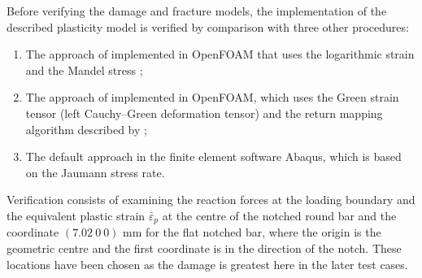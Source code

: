 \documentclass[sn-mathphys,Numbered]{sn-jnl}%
\begin{document}
Before verifying the damage and fracture models, the implementation of the described plasticity model is verified by comparison with three other procedures:
\begin{enumerate}[label=(\alph*)]
	\item The approach of \citet{clancy_improving_2019} implemented in OpenFOAM that uses the logarithmic strain and the Mandel stress \cite{caminero_modeling_2011};
	\item The approach of \citet{cardiff_lagrangian_2017} implemented in OpenFOAM, which uses the Green strain tensor (left Cauchy–Green deformation tensor) and the return mapping algorithm described by \citet{simo_computational_1998};
	\item The default approach in the finite element software Abaqus, which is based on the Jaumann stress rate.
\end{enumerate}

Verification consists of examining the reaction forces at the loading boundary and the equivalent plastic strain $\bar{\varepsilon}_p$ at the centre of the notched round bar and the coordinate $(7.02\ 0\ 0)$ mm for the flat notched bar, where the origin is the geometric centre and the first coordinate is in the direction of the notch.
These locations have been chosen as the damage is greatest here in the later test cases.





%
\end{document}
